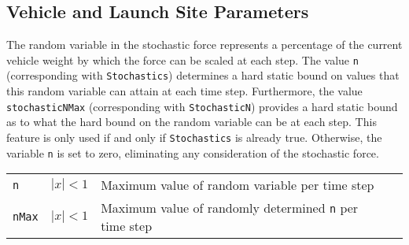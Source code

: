\documentclass[11pt]{thesis}
\numberwithin{equation}{section}
\begin{document}
\subsection{Vehicle and Launch Site Parameters}
The random variable in the stochastic force represents a percentage of the current vehicle weight by which the force can be scaled at each step. The value \texttt{n} (corresponding with \texttt{Stochastics}) determines a hard static bound on values that this random variable can attain at each time step. Furthermore, the value \texttt{stochasticNMax} (corresponding with \texttt{StochasticN}) provides a hard static bound as to what the hard bound on the random variable can be at each step. This feature is only used if and only if \texttt{Stochastics} is already true. Otherwise, the variable \texttt{n} is set to zero, eliminating any consideration of the stochastic force.
\begin{longtable}[l]{l l l l}
\texttt{n} & $|x| < 1$ & Maximum value of random variable per time step \\
\texttt{nMax} & $|x| < 1$ & Maximum value of randomly determined \texttt{n} per time step
\end{longtable}
\end{document}
